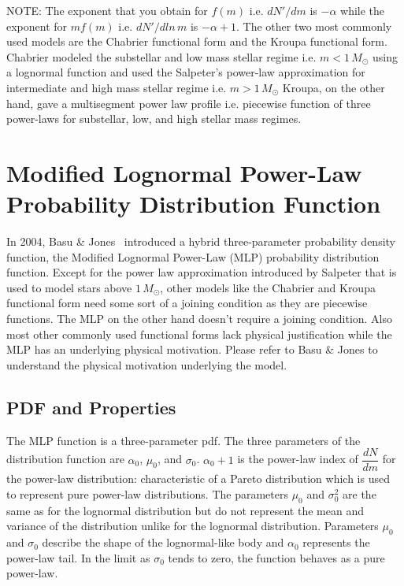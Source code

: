\documentclass{article}
\begin{document}
NOTE: The exponent that you obtain for $f(m)$ i.e. $dN'/dm$ is $-\alpha$ while the exponent for $mf(m)$ i.e. $dN'/dln\,m$ is $-\alpha + 1$.
The other two most commonly used models are the Chabrier functional form and the Kroupa functional form.
Chabrier modeled  the substellar and low mass stellar regime  i.e. $m < 1\,M_{\odot}$ using a lognormal function and used the Salpeter's power-law approximation for intermediate and high mass stellar regime i.e. $m > 1\,M_{\odot}$
Kroupa, on the other hand, gave a multisegment power law profile i.e. piecewise function of three power-laws for substellar, low, and high stellar mass regimes.

\section{Modified Lognormal Power-Law Probability Distribution Function}

In 2004, Basu \& Jones~\cite{Basu2004} introduced a hybrid three-parameter probability density function, the Modified Lognormal Power-Law (MLP) probability distribution function. Except for the power law approximation introduced by Salpeter that is used to model  stars above $1\,M_{\odot}$, other models like the Chabrier and Kroupa functional form need some sort of a joining condition as they are piecewise functions. The MLP on the other hand doesn't require a joining condition. Also most other commonly used functional forms lack physical justification while the MLP has an underlying physical motivation. 
Please refer to  Basu \& Jones to understand the physical motivation underlying the model.  


\subsection{PDF and Properties}
The MLP function is a three-parameter pdf. The three parameters of the distribution function are $\alpha_0$, $\mu_{0}$, and $\sigma_{0}$. $\alpha_0 + 1$ is the power-law index of $\dfrac{dN}{dm}$ for the power-law distribution: characteristic of a Pareto distribution which is used to represent pure power-law distributions. The parameters $\mu_{0}$ and $\sigma^{2}_{0}$ are the same as for the lognormal distribution but do not represent the mean and variance of the distribution unlike for the lognormal distribution. Parameters $\mu_{0}$ and $\sigma_{0}$ describe the shape of the lognormal-like body and $\alpha_0$ represents the power-law tail. In the limit as $\sigma_{0}$ tends to zero, the function behaves as a pure power-law. 
\end{document}
